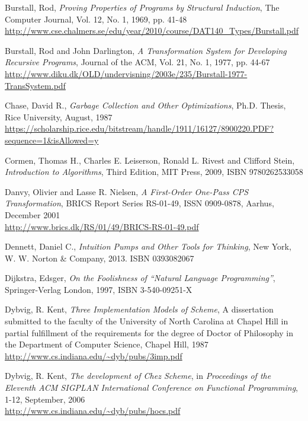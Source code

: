 \begin{thebibliography}{90}
  Burstall, Rod, \emph{Proving Properties of Programs by Structural Induction},
  The Computer Journal, Vol. 12, No. 1, 1969, pp. 41-48 \\
  \url{http://www.cse.chalmers.se/edu/year/2010/course/DAT140_Types/Burstall.pdf}
  
  Burstall, Rod and John Darlington,
  \emph{A Transformation System for Developing Recursive Programs},
  Journal of the ACM, Vol. 21, No. 1, 1977, pp. 44-67 \\
  \url{http://www.diku.dk/OLD/undervisning/2003e/235/Burstall-1977-TransSystem.pdf}

  Chase, David R., \emph{Garbage Collection and Other Optimizations},
  Ph.D. Thesis, Rice University, August, 1987 \\
  \url{https://scholarship.rice.edu/bitstream/handle/1911/16127/8900220.PDF?sequence=1&isAllowed=y}
  
  Cormen, Thomas H., Charles E. Leiserson, Ronald L. Rivest
  and Clifford Stein,
  \emph{Introduction to Algorithms},
  Third Edition, MIT Press, 2009, ISBN 9780262533058

  Danvy, Olivier and Lasse R. Nielsen,
  \emph{A First-Order One-Pass CPS Transformation},
  BRICS Report Series RS-01-49, ISSN 0909-0878,
  Aarhus, December 2001 \\
  \url{http://www.brics.dk/RS/01/49/BRICS-RS-01-49.pdf}

  Dennett, Daniel C., \emph{Intuition Pumps and Other Tools for Thinking},
  New York, W. W. Norton \& Company, 2013. ISBN 0393082067
  
  Dijkstra, Edsger,
  \emph{On the Foolishness of ``Natural Language Programming''},
  Springer-Verlag London, 1997,
  ISBN 3-540-09251-X 

  Dybvig, R. Kent,
  \emph{Three Implementation Models of Scheme}, A dissertation
  submitted to the faculty of the University of North Carolina
  at Chapel Hill in partial fulfillment of the requirements
  for the degree of Doctor of Philosophy in the Department of
  Computer Science, Chapel Hill, 1987 \\
  \url{http://www.cs.indiana.edu/~dyb/pubs/3imp.pdf}

  Dybvig, R. Kent,
  \emph{The development of Chez Scheme},
  in \emph{Proceedings of the Eleventh ACM SIGPLAN International
    Conference on Functional Programming}, 1-12, September, 2006 \\
  \url{http://www.cs.indiana.edu/~dyb/pubs/hocs.pdf}
  

\end{thebibliography}
